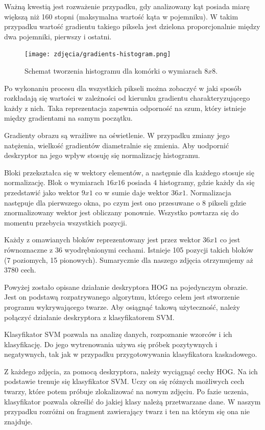 Ważną kwestią jest rozważenie przypadku, gdy analizowany kąt posiada miarę większą niż 160 stopni (maksymalna wartość kąta w pojemniku). W takim przypadku wartość gradientu takiego piksela jest dzielona proporcjonalnie między dwa pojemniki, pierwszy i ostatni.

\begin{figure}[h]
	\centering
	\texttt{[image: zdjęcia/gradients-histogram.png]}
	\caption{Schemat tworzenia histogramu dla komórki o wymiarach $8x8$. \cite{hog2}} 
	\label{fig:gradientHistogram}
\end{figure}

Po wykonaniu procesu dla wszystkich pikseli można zobaczyć w jaki sposób rozkładają się wartości w zależności od kierunku gradientu charakteryzującego każdy z nich. Taka reprezentacja zapewnia odporność na szum, który istnieje między gradientami na samym początku. 

Gradienty obrazu są wrażliwe na oświetlenie. W przypadku zmiany jego natężenia, wielkość gradientów diametralnie się zmienia. Aby uodpornić deskryptor na jego wpływ stosuję się normalizację histogramu. 

Bloki przekształca się w wektory elementów, a następnie dla każdego stosuje się normalizację. Blok o wymiarach $16x16$ posiada 4 histogramy, gdzie każdy da się przedstawić jako wektor $9x1$ co w sumie daje wektor $36x1$. Normalizacja następuje dla pierwszego okna, po czym jest ono przesuwane o 8 pikseli gdzie znormalizowany wektor jest obliczany ponownie. Wszystko powtarza się do momentu przebycia wszystkich pozycji.

Każdy z omawianych bloków reprezentowany jest przez wektor $36x1$ co jest równoznaczne z 36 wyodrębnionymi cechami. Istnieje 105 pozycji takich bloków (7 poziomych, 15 pionowych). Sumarycznie dla naszego zdjęcia otrzymujemy aż 3780 cech.

Powyżej zostało opisane działanie deskryptora HOG na pojedynczym obrazie. Jest on podstawą rozpatrywanego algorytmu, którego celem jest stworzenie programu wykrywającego twarze. Aby osiągnąć takową użyteczność, należy połączyć działanie deskryptora z klasyfikatorem SVM.

Klasyfikator SVM pozwala na analizę danych, rozpoznanie wzorców i ich klasyfikację. Do jego wytrenowania używa się próbek pozytywnych i negatywnych, tak jak w przypadku przygotowywania klasyfikatora kaskadowego.

Z każdego zdjęcia, za pomocą deskryptora, należy wyciągnąć cechy HOG. Na ich podstawie trenuje się klasyfikator SVM. Uczy on się różnych możliwych cech twarzy, które potem próbuje zlokalizować na nowym zdjęciu. Po fazie uczenia, klasyfikator pozwala określić do jakiej klasy należą przetwarzane dane. W naszym przypadku rozróżni on fragment zawierający twarz i ten na którym się ona nie znajduje. 

